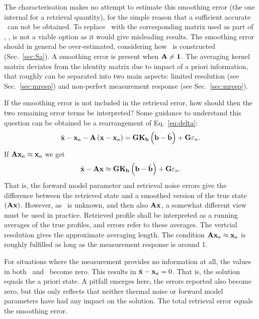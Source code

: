 The characterisation makes no attempt to estimate this smoothing error (the one
internal for a retrieval quantity), for the simple reason that a sufficient
accurate \aCvrMtr{\SttVct}\ can not be obtained. To replace \aCvrMtr{\SttVct}\
with the corresponding matrix used as part of \OEM, , is not a
viable option as it would give misleading results. The smoothing error should
in general be over-estimated, considering how \aCvrMtr{\SttVct}\ is constructed
(Sec.~\ref{sec:Sa}). A smoothing error is present when $\mathbf{A}\neq\mathbf{1}$.
The averaging kernel matrix deviates from the identity matrix due to impact of
a priori information, that roughly can be separated into two main aspects:
limited resolution (see Sec.~\ref{sec:mresp}) and non-perfect measurement
response (see Sec.~\ref{sec:mresp}).

If the smoothing error is not included in the retrieval error, how should then
the two remaining error terms be interpreted? Some guidance to understand this
question can be obtained be a rearrangement of Eq.~\ref{eq:delta}:
\begin{equation}
  \hat{\mathbf{x}} -\mathbf{x}_{a} - \mathbf{A}\left( \mathbf{x}-\mathbf{x}_{a} \right) = 
    \mathbf{G}\mathbf{K}_{\mathbf{b}}\left(\mathbf{b}-\hat{\mathbf{b}}\right) +
    \mathbf{G}\varepsilon_n.
\end{equation}
If $\mathbf{A}\mathbf{x}_{a}\approx\mathbf{x}_{a}$ we get
\begin{equation}
  \hat{\mathbf{x}} - \mathbf{A}\mathbf{x} \approx 
    \mathbf{G}\mathbf{K}_{\mathbf{b}}\left(\mathbf{b}-\hat{\mathbf{b}}\right) +
    \mathbf{G}\varepsilon_n.
\end{equation}
That is, the forward model parameter and retrieval noise errors give the
difference between the retrieved state and a smoothed version of the true state
$(\mathbf{A}\mathbf{x})$. However, as \SttVct\ is unknown, and then also
$\mathbf{A}\mathbf{x}$, a somewhat different view must be used in practice.
Retrieved profile shall be interpreted as a running averages of the true
profiles, and errors refer to these averages. The vertcial resolution gives the
approximate averaging length. The condition
$\mathbf{A}\mathbf{x}_{a}\approx\mathbf{x}_{a}$ is roughly fulfilled as long as the
measurement response is around 1.

For situations where the measurement provides no information at all, the values
in both \CtrFncMtr\ and \AvrKrnMtr\ become zero. This results in $\hat{\mathbf{x}} -
\mathbf{x}_{a} = 0$. That is, the solution equals the a priori state. A pitfall
emerges here, the errors reported also become zero, but this only reflects that
neither thermal noise or forward model parameters have had any impact on the
solution. The total retrieval error equals the smoothing error.


